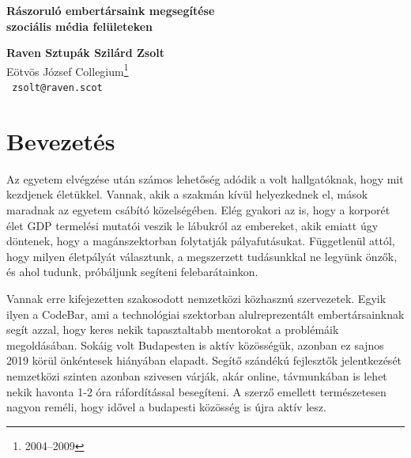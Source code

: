 \documentclass[a5paper,10pt]{article}
\begin{document}


\renewcommand{\thefootnote}{\fnsymbol{footnote}}

\begin{center}{\Large\bf
Rászoruló embertársaink megsegítése\\[1mm] szociális média felületeken
}\end{center}
\vspace*{1mm}
%
\begin{center}{\large\bf\noindent
Raven Sztupák Szilárd Zsolt
}\\[3mm]
%
Eötvös József Collegium{\footnote[1]{2004--2009}}
%
\\[2mm]\texttt{
zsolt@raven.scot}
\end{center}
\vspace*{7mm}
\renewcommand{\thefootnote}{\arabic{footnote}}




\section{Bevezetés}

Az egyetem elvégzése után számos lehetőség adódik a volt hallgatóknak, hogy mit kezdjenek életükkel. Vannak, akik a szakmán kívül helyezkednek el, mások maradnak az egyetem csábító közelségében. Elég gyakori az is, hogy a korporét élet GDP termelési mutatói veszik le lábukról az embereket, akik emiatt úgy döntenek, hogy a magánszektorban folytatják pályafutásukat. Függetlenül attól, hogy milyen életpályát választunk, a megszerzett tudásunkkal ne legyünk önzők, és ahol tudunk, próbáljunk segíteni felebarátainkon.

\bigskip

Vannak erre kifejezetten szakosodott nemzetközi közhasznú szervezetek. Egyik ilyen a CodeBar\cite{codebar}, ami a technológiai szektorban alulreprezentált embertársainknak segít azzal, hogy keres nekik tapasztaltabb mentorokat a problémáik megoldásában. Sokáig volt Budapesten is aktív közösségük, azonban ez sajnos 2019 körül önkéntesek hiányában elapadt. Segítő szándékú fejlesztők jelentkezését nemzetközi szinten azonban szivesen várják, akár online, távmunkában is lehet nekik havonta 1-2 óra ráfordítással besegíteni. A szerző emellett természetesen nagyon reméli, hogy idővel a budapesti közösség is újra aktív lesz.

\bigskip
\end{document}

